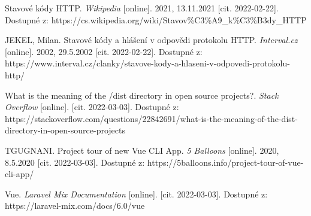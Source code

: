 \begin{thebibliography}{50}
Stavové kódy HTTP. \textit{Wikipedia} [online]. 2021, 13.11.2021 [cit. 2022-02-22]. Dostupné z: https://cs.wikipedia.org/wiki/Stavov\%C3\%A9\_k\%C3\%B3dy\_HTTP

JEKEL, Milan. Stavové kódy a hlášení v odpovědi protokolu HTTP. \textit{Interval.cz} [online]. 2002, 29.5.2002 [cit. 2022-02-22]. Dostupné z: https://www.interval.cz/clanky/stavove-kody-a-hlaseni-v-odpovedi-protokolu-http/

What is the meaning of the /dist directory in open source projects?. \textit{Stack Overflow} [online]. [cit. 2022-03-03]. Dostupné z: https://stackoverflow.com/questions/22842691/what-is-the-meaning-of-the-dist-directory-in-open-source-projects

TGUGNANI. Project tour of new Vue CLI App. \textit{5 Balloons} [online]. 2020, 8.5.2020 [cit. 2022-03-03]. Dostupné z: https://5balloons.info/project-tour-of-vue-cli-app/

Vue. \textit{Laravel Mix Documentation} [online]. [cit. 2022-03-03]. Dostupné z: https://laravel-mix.com/docs/6.0/vue

\end{thebibliography}
